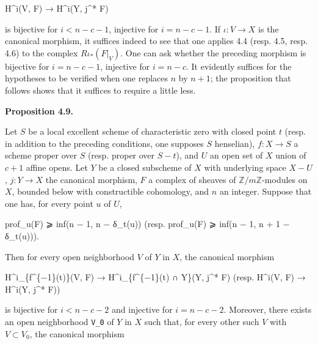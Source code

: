 \documentclass[
]{article}
\newenvironment{Shaded}{}{}
\newcommand{\NormalTok}[1]{#1}
\begin{document}
\begin{Shaded}
\begin{Highlighting}[]
\NormalTok{H\^{}i(V, F) → H\^{}i(Y, j\^{}* F)}
\end{Highlighting}
\end{Shaded}

is bijective for \(i < n - c - 1\), injective for \(i = n - c - 1\). If
\(\iota : V \to X\) is the canonical morphism, it suffices indeed to see
that one applies 4.4 (resp. 4.5, resp. 4.6) to the complex
\(R \iota_{*}(F|_{V})\). One can ask whether the preceding morphism is
bijective for \(i = n - c - 1\), injective for \(i = n - c\). It
evidently suffices for the hypotheses to be verified when one replaces
\(n\) by \(n + 1\); the proposition that follows shows that it suffices
to require a little less.

\textbf{Proposition 4.9.}

Let \(S\) be a local excellent scheme of characteristic zero with closed
point \(t\) (resp. in addition to the preceding conditions, one supposes
\(S\) henselian), \(f : X \to S\) a scheme proper over \(S\) (resp.
proper over \(S - {t}\)), and \(U\) an open set of \(X\) union of
\(c + 1\) affine opens. Let \(Y\) be a closed subscheme of \(X\) with
underlying space \(X - U\), \(j : Y \to X\) the canonical morphism,
\(F\) a complex of sheaves of \(\mathbb{Z}/m\mathbb{Z}\)-modules on
\(X\), bounded below with constructible cohomology, and \(n\) an
integer. Suppose that one has, for every point \(u\) of \(U\),

\begin{Shaded}
\begin{Highlighting}[]
\NormalTok{prof\_u(F) ⩾ inf(n − 1, n − δ\_t(u))  (resp. prof\_u(F) ⩾ inf(n − 1, n + 1 − δ\_t(u))).}
\end{Highlighting}
\end{Shaded}

Then for every open neighborhood \(V\) of \(Y\) in \(X\), the canonical
morphism

\begin{Shaded}
\begin{Highlighting}[]
\NormalTok{H\^{}i\_\{f\^{}\{−1\}(t)\}(V, F) → H\^{}i\_\{f\^{}\{−1\}(t) ∩ Y\}(Y, j\^{}* F)   (resp. H\^{}i(V, F) → H\^{}i(Y, j\^{}* F))}
\end{Highlighting}
\end{Shaded}

is bijective for \(i < n - c - 2\) and injective for \(i = n - c - 2\).
Moreover, there exists an open neighborhood \texttt{V\_0} of \(Y\) in
\(X\) such that, for every other such \(V\) with \(V \subset V_{0}\),
the canonical morphism
\end{document}
